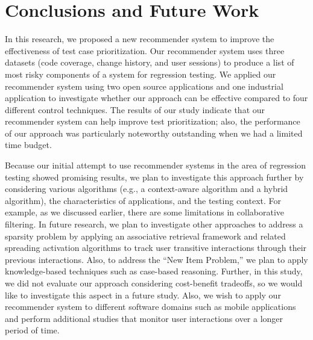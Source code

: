 
\section{Conclusions and Future Work}
\label{sec:conclusions}

In this research, we proposed a new recommender system to 
improve the effectiveness of test case prioritization. 
Our recommender system uses three datasets (code coverage, change history, and user sessions)
to produce a list of most risky components of a system for regression testing.
We applied our recommender system using two open source applications and 
one industrial application to investigate whether our approach 
can be effective compared to four different control techniques.
The results of our study indicate that our recommender system can help 
improve test prioritization; also, the performance of our approach 
was particularly noteworthy  outstanding when we had a limited time budget. 

Because our initial attempt to use recommender systems in the area of regression 
testing showed promising results, we plan to investigate this approach further
by considering various algorithms (e.g., a context-aware algorithm and a hybrid algorithm), 
the characteristics of applications, and the testing context.
For example, as we discussed earlier, there are some limitations in collaborative 
filtering. In future research, we plan to investigate other approaches 
to address a sparsity problem by applying an associative
retrieval framework and related spreading activation algorithms
to track user transitive interactions through their previous interactions. 
Also, to address the ``New Item Problem,'' we plan to apply 
knowledge-based techniques such as case-based reasoning. 
Further, in this study, we did not evaluate our approach considering
cost-benefit tradeoffs, so we would like to investigate this aspect in a future study. 
Also, we wish to apply our recommender system to different software domains 
such as mobile applications and perform additional studies that
monitor user interactions over a longer period of time.

